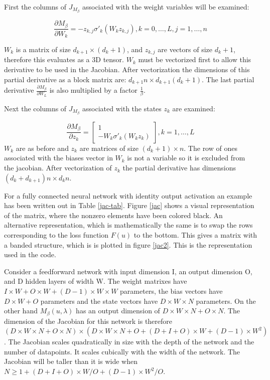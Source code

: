  First the columns of $J_{M_{\beta}}$ associated with the weight variables will be examined:
 
\begin{equation}
	\frac{\partial{M_{\beta}}}{\partial W_k} = -z_{k,j}\sigma'_k(W_kz_{k,j}), k = 0,\ldots,L, j = 1,\ldots,n
\end{equation}

$W_k$ is a matrix of size $d_{k+1}\times(d_k+1)$, and $z_{k,j}$ are vectors of size $d_k+1$, therefore this evaluates as a 3D tensor. $W_k$ must be vectorized first to allow this derivative to be used in the Jacobian. After vectorization the dimensions of this partial derivative as a block matrix are: $d_{k+1}n \times d_{k+1}(d_{k}+1)$. The last partial derivative $\frac{\partial{M_{\beta}}}{\partial W_L}$ is also multiplied by a factor $\frac{1}{\beta}$.

 Next the columns of $J_{M_{\beta}}$ associated with the states $z_k$ are examined:
 
 \begin{equation}
 	\frac{\partial{M_{\beta}}}{\partial z_k} = \begin{bmatrix} 1 \\ -W_k\sigma'_k(W_kz_k) \end{bmatrix}, k = 1,\ldots,L
 \end{equation}
 $W_k$ are as before and $z_k$ are matrices of size $(d_k+1)\times n$. The row of ones associated with the biases vector in $W_k$ is not a variable so it is excluded from the jacobian. After vectorization of $z_k$ the partial derivative has dimensions $(d_k+d_{k+1})n\times d_kn$.
 
For a fully connected neural network with identity output activation an example has been written out in Table \ref{jac-tab}. Figure \ref{jac} shows a visual representation of the matrix, where the nonzero elements have been colored black. An alternative representation, which is mathematically the same is to swap the rows corresponding to the loss function $F(u)$ to the bottom. This gives a matrix with a banded structure, which is is plotted in figure \ref{jac2}. This is the representation used in the code.


Consider a feedforward network with input dimension I, an output dimension O, and D hidden layers of width W. The weight matrixes have $I\times W + O\times W + (D-1)\times W\times W$ parameters, the bias vectors have $D\times W+O$ parameters and the state vectors have $D\times W\times N$ parameters. On the other hand $M_{\beta}(u,\lambda)$ has an output dimension of $D\times W \times N + O\times N$. The dimension of the Jacobian for this network is therefore $(D \times W\times N + O\times N)\times (D\times W\times N + O + (D+I+O)\times W + (D-1)\times W^2)$. The Jacobian scales quadratically in size with the depth of the network and the number of datapoints. It scales cubically with the width of the network. The Jacobian will be taller than it is wide when $N \geq 1 + (D+I+O)\times W/O + (D-1)\times W^2/O$. 


